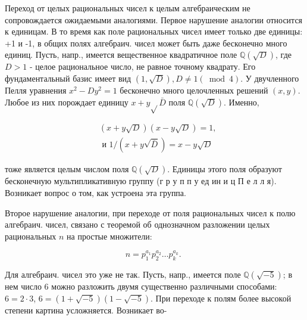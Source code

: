 \documentclass[10pt]{article}
\begin{document}
Переход от целых рациональных чисел к целым алгебраическим не сопровождается ожидаемыми аналогиями. Первое нарушение аналогии относится к единицам. В то время как поле рациональных чисел имеет только две единицы: +1 и -1, в общих полях алгебраич. чисел может быть даже бесконечно много единиц. Пусть, напр., имеется вещественное квадратичное поле $\mathbb{Q}(\sqrt{D})$, где $D>1$ - целое рациональное число, не равное точному квадрату. Его фундаментальный базис имеет вид $(1, \sqrt{D}), D \neq 1(\bmod 4)$. У двучленного Пелля уравнения $x^{2}-D y^{2}=1$ бесконечно много целочленных решений $(x, y)$. Любое из них порождает единицу $x+y \sqrt{ } \bar{D}$ поля $\mathbb{Q}(\sqrt{D})$. Именно,



\[

\begin{aligned}

& (x+y \sqrt{D})(x-y \sqrt{D})=1, \\

& \text { и } 1 /(x+y \sqrt{\bar{D}})=x-y \sqrt{D}

\end{aligned}

\]



тоже является целым числом поля $\mathbb{Q}(\sqrt{D})$. Единицы этого поля образуют бесконечную мультипликативную группу (г р у п п у ед ин и ц П е л л я). Возникает вопрос о том, как устроена эта группа.



Второе нарушение аналогии, при переходе от поля рациональных чисел к полю алгебраич. чисел, связано с теоремой об однозначном разложении целых рациональных $n$ на простые множители:



\[

n=p_{1}^{a_{1}} p_{2}^{a_{2}} \ldots p_{k}^{a_{k}} \text {. }

\]



Для алгебраич. чисел это уже не так. Пусть, напр., имеется поле $\mathbb{Q}(\sqrt{-5})$; в нем число 6 можно разложить двумя существенно различными способами: $6=2 \cdot 3$, $6=(1+\sqrt{-5})(1-\sqrt{-5})$. При переходе к полям более высокой степени картина усложняется. Возникает во-
\end{document}
